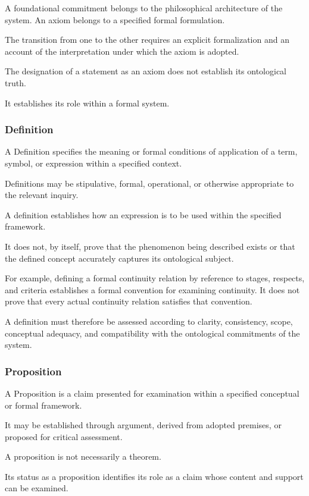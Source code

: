 A foundational commitment
belongs to the philosophical
architecture of the system.
An axiom belongs to a
specified formal formulation.

The transition from one
to the other requires
an explicit formalization
and an account of the
interpretation under which
the axiom is adopted.

The designation of a statement
as an axiom does not establish
its ontological truth.

It establishes its role
within a formal system.

\subsubsection{Definition}

A Definition specifies
the meaning or formal
conditions of application
of a term, symbol, or
expression within a
specified context.

Definitions may be
stipulative, formal,
operational, or otherwise
appropriate to the
relevant inquiry.

A definition establishes
how an expression is
to be used within the
specified framework.

It does not, by itself,
prove that the phenomenon
being described exists
or that the defined
concept accurately
captures its ontological
subject.

For example, defining
a formal continuity
relation by reference
to stages, respects,
and criteria establishes
a formal convention
for examining continuity.
It does not prove
that every actual
continuity relation
satisfies that convention.

A definition must therefore
be assessed according
to clarity, consistency,
scope, conceptual adequacy,
and compatibility with
the ontological commitments
of the system.

\subsubsection{Proposition}

A Proposition is a claim
presented for examination
within a specified
conceptual or formal
framework.

It may be established
through argument, derived
from adopted premises,
or proposed for critical
assessment.

A proposition is not
necessarily a theorem.

Its status as a proposition
identifies its role as
a claim whose content
and support can be
examined.

